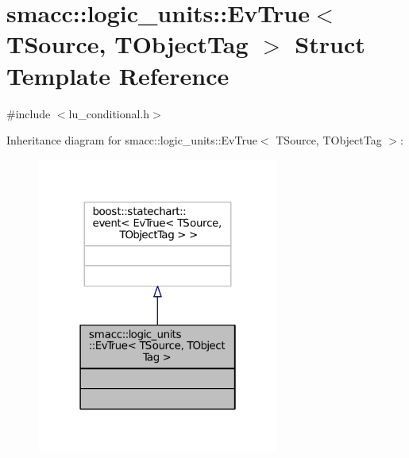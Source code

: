 \hypertarget{structsmacc_1_1logic__units_1_1EvTrue}{}\section{smacc\+:\+:logic\+\_\+units\+:\+:Ev\+True$<$ T\+Source, T\+Object\+Tag $>$ Struct Template Reference}
\label{structsmacc_1_1logic__units_1_1EvTrue}


{\ttfamily \#include $<$lu\+\_\+conditional.\+h$>$}



Inheritance diagram for smacc\+:\+:logic\+\_\+units\+:\+:Ev\+True$<$ T\+Source, T\+Object\+Tag $>$\+:
\nopagebreak
\begin{figure}[H]
\begin{center}
\leavevmode
\includegraphics[width=226pt]{structsmacc_1_1logic__units_1_1EvTrue__inherit__graph}
\end{center}
\end{figure}


